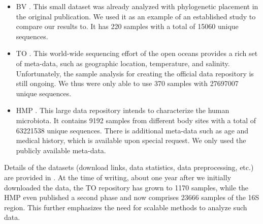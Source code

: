 \begin{itemize}
    \item   \acf{BV} \cite{Srinivasan2012}.
            This small dataset was already analyzed with phylogenetic placement in the original publication.
            We used it as an example of an established study to compare our results to.
            It has \num{220} samples with a total of \num{15 060} unique sequences.
    \item   \acf{TO} \cite{Karsenti2011,Sunagawa2015,Guidi2016}.
            This world-wide sequencing effort of the open oceans provides a rich set of meta-data,
            such as geographic location, temperature, and salinity.
            Unfortunately, the sample analysis for creating the official data repository is still ongoing.
            We thus were only able to use \num{370} samples with \num{27 697 007} unique sequences.
    \item   \acf{HMP} \cite{Huttenhower2012,Methe2012}.
            This large data repository intends to characterize the human microbiota.
            It contains \num{9192} samples from different body sites with a total of \num{63 221 538} unique sequences.
            There is additional meta-data such as age and medical history, which is available upon special request.
            We only used the publicly available meta-data.
\end{itemize}

Details of the datasets (download links, data statistics, data preprocessing, etc.)
are provided in . %
At the time of writing, about one year after we initially downloaded the data,
the \ac{TO} repository has grown to \num{1 170} samples,
while the \ac{HMP} even published a second phase and now comprises \num{23 666} samples of the 16S region.
This further emphasizes the need for scalable methods to analyze such data.

